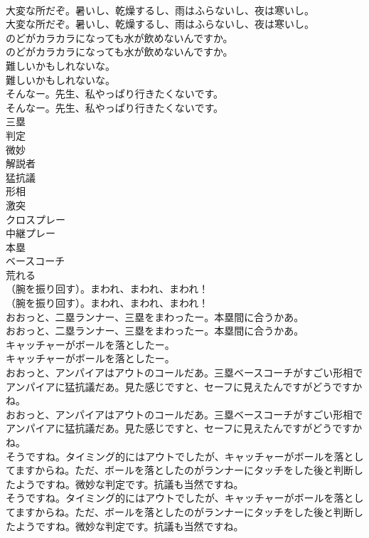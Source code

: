 \documentclass[8pt]{extreport}
\begin{document}
\begin{CJK}{UTF8}{min}
\\	大変な所だぞ。暑いし、乾燥するし、雨はふらないし、夜は寒いし。	
\\	大変な所だぞ。暑いし、乾燥するし、雨はふらないし、夜は寒いし。 
\\	のどがカラカラになっても水が飲めないんですか。	
\\	のどがカラカラになっても水が飲めないんですか。 
\\	難しいかもしれないな。	
\\	難しいかもしれないな。 
\\	そんなー。先生、私やっぱり行きたくないです。	
\\	そんなー。先生、私やっぱり行きたくないです。 
\\	三塁
\\	判定
\\	微妙
\\	解説者
\\	猛抗議
\\	形相
\\	激突
\\	クロスプレー
\\	中継プレー
\\	本塁
\\	ベースコーチ
\\	荒れる
\\	（腕を振り回す）。まわれ、まわれ、まわれ！	
\\	（腕を振り回す）。まわれ、まわれ、まわれ！ 
\\	おおっと、二塁ランナー、三塁をまわったー。本塁間に合うかあ。	
\\	おおっと、二塁ランナー、三塁をまわったー。本塁間に合うかあ。 
\\	キャッチャーがボールを落としたー。	
\\	キャッチャーがボールを落としたー。 
\\	おおっと、アンパイアはアウトのコールだあ。三塁ベースコーチがすごい形相でアンパイアに猛抗議だあ。見た感じですと、セーフに見えたんですがどうですかね。	
\\	おおっと、アンパイアはアウトのコールだあ。三塁ベースコーチがすごい形相でアンパイアに猛抗議だあ。見た感じですと、セーフに見えたんですがどうですかね。 
\\	そうですね。タイミング的にはアウトでしたが、キャッチャーがボールを落としてますからね。ただ、ボールを落としたのがランナーにタッチをした後と判断したようですね。微妙な判定です。抗議も当然ですね。	
\\	そうですね。タイミング的にはアウトでしたが、キャッチャーがボールを落としてますからね。ただ、ボールを落としたのがランナーにタッチをした後と判断したようですね。微妙な判定です。抗議も当然ですね。 

\end{CJK}
\end{document}

